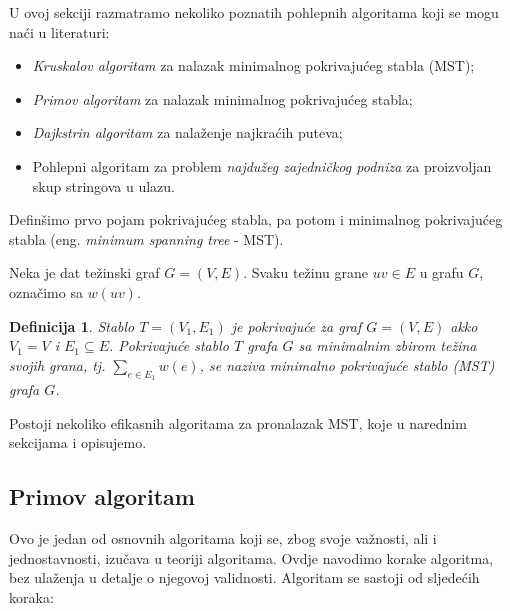 \documentclass[a4paper, utf8, 11pt, colorlinks]{book}
\newtheorem{definition}{Definicija}[chapter]
\theoremstyle{definition}
\begin{document}
U ovoj sekciji razmatramo nekoliko poznatih pohlepnih algoritama koji se mogu naći u literaturi:
\begin{itemize}
	\item  \emph{Kruskalov algoritam} za nalazak minimalnog pokrivajućeg stabla (MST);
	\item  \emph{Primov algoritam} za nalazak minimalnog pokrivajućeg stabla;
	\item  \emph{Dajkstrin algoritam} za nalaženje najkraćih puteva;
	\item  Pohlepni algoritam za problem \emph{najdužeg zajedničkog podniza} za proizvoljan skup stringova u ulazu.
\end{itemize}

Definšimo prvo pojam pokrivajućeg stabla, pa potom i minimalnog pokrivajućeg stabla (eng. \emph{minimum spanning tree} - MST).

Neka je dat težinski graf $G=(V,E)$. Svaku težinu grane $uv \in E $ u grafu $G$, označimo sa $w(uv)$. 
 
\begin{definition}
  Stablo $T =(V_1, E_1)$ je pokrivajuće za graf $G=(V,E)$ akko
  $V_1 = V$ i $E_1 \subseteq E$. Pokrivajuće stablo $T$ grafa $G$ sa minimalnim zbirom težina svojih grana, tj. 
  $\sum_{e \in E_1} w(e)$, se naziva minimalno pokrivajuće stablo (MST) grafa $G$. 
\end{definition}
Postoji nekoliko efikasnih algoritama za pronalazak MST, koje u narednim sekcijama i opisujemo. 


\subsection{Primov algoritam}
Ovo je jedan od osnovnih algoritama koji se, zbog svoje važnosti, ali i jednostavnosti, izučava u teoriji algoritama. Ovdje navodimo korake algoritma, bez ulaženja u detalje o njegovoj validnosti. Algoritam se sastoji od sljedećih koraka:
\end{document}

